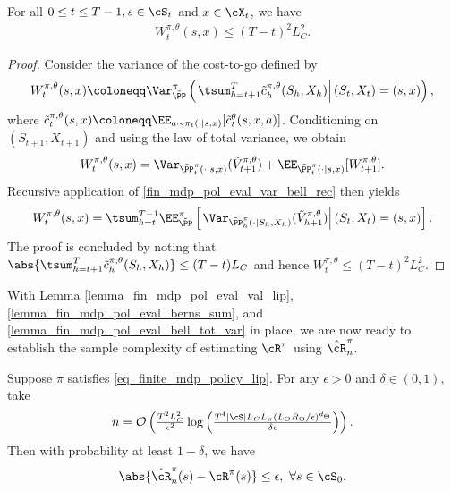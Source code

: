 \documentclass[9pt]{article}
\numberwithin{equation}{section}
\begin{document}
%
\begin{lemma}
    \label{lemma_fin_mdp_pol_eval_bell_tot_var}
    For all $0 \leq t \leq T-1, s \in \cS_t$ and $ x \in \cX_t$, we have
    \begin{align*} 
    W_{t}^{\pi, \theta}(s,x)  \leq (T-t)^2 L_C^2. 
    \end{align*}
\end{lemma}
\begin{proof}
    Consider
    the variance of the cost-to-go defined by
    \begin{align}
    W_t^{\pi, \theta}(s,x) \coloneqq \Var_{\tilde \PP}^\pi \left( \left. \tsum_{h=t+1}^{T} \tilde{c}_h^{\pi, \theta}(S_h, X_h) \right| (S_t, X_t) = (s,x) \right), \nonumber
    \end{align}
    where $\tilde{c}_t^{\pi, \theta}(s,x) \coloneqq \EE_{a \sim \pi_t(\cdot|s,x)}[\tilde{c}_t^\theta(s,x,a)]$. Conditioning on $(S_{t+1}, X_{t+1})$ and using the law of total variance, we obtain
    \begin{align}
        W_t^{\pi, \theta}(s,x) = \Var_{\tilde{\PP}_t^\pi(\cdot|s,x)}(\tilde{V}_{t+1}^{\pi, \theta}) + \EE_{\tilde{\PP}_t^\pi(\cdot|s,x)} [W_{t+1}^{\pi, \theta}]. \label{fin_mdp_pol_eval_var_bell_rec}
    \end{align}
    Recursive application of \eqref{fin_mdp_pol_eval_var_bell_rec} then yields
    \begin{align}
    W_t^{\pi, \theta}(s,x) = \tsum_{h = t}^{T-1} \EE_{\tilde \PP}^\pi \left[ \left. \Var_{\tilde{\PP}_h^\pi (\cdot|S_{h}, X_{h})} (\tilde{V}_{h+1}^{\pi, \theta}) \right| (S_t, X_t) = (s,x) \right]. \nonumber
    \end{align}
    The proof is concluded by noting that $\abs{\tsum_{h=t+1}^{T} \tilde{c}_h^{\pi, \theta}(S_h, X_h)} \leq (T-t) L_C$ and hence $W_t^{\pi, \theta} \leq (T-t)^2 L_C^2$.
\end{proof}
%

With Lemma \ref{lemma_fin_mdp_pol_eval_val_lip}, \ref{lemma_fin_mdp_pol_eval_berns_sum}, and \ref{lemma_fin_mdp_pol_eval_bell_tot_var} in place, we are now ready to establish the sample complexity of estimating $\cR^\pi$ using $\hat{\cR}^\pi_n$.


%
\begin{theorem}\label{thrm_sample_fin_mdpite_eval}
Suppose $\pi$ satisfies \eqref{eq_finite_mdp_policy_lip}.
    For any $\epsilon > 0$ and $\delta \in (0,1)$, take 
    \begin{align*}
        n =  \mathcal{O}\left(\tfrac{T^2L_C^2}{\epsilon^2}\log \left(\tfrac{T^4 |\cS| L_C L_\pi (L_\Theta R_\Theta /\epsilon)^{d_\Theta}}{\delta \epsilon}\right)\right).
    \end{align*}
    Then with probability at least $1-\delta$,  we have
    \begin{align*} 
    \abs{\hat{\cR}_n^\pi(s) - \cR^\pi(s) } 
    \leq \epsilon,
    ~ \forall s \in \cS_0.
    \end{align*} 
\end{theorem}
\end{document}

